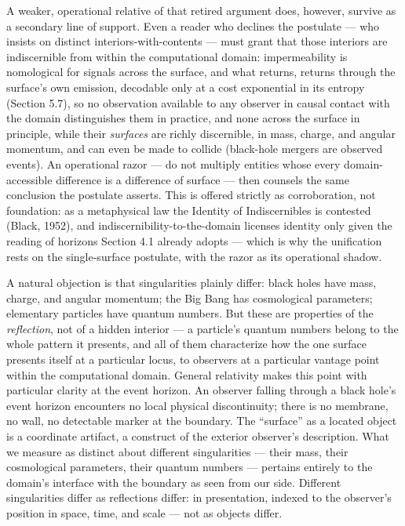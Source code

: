 \documentclass[
]{article}
\begin{document}
A weaker, operational relative of that retired argument does, however,
survive as a secondary line of support. Even a reader who declines the
postulate --- who insists on distinct interiors-with-contents --- must
grant that those interiors are indiscernible from within the
computational domain: impermeability is nomological for signals across
the surface, and what returns, returns through the surface's own
emission, decodable only at a cost exponential in its entropy (Section
5.7), so no observation available to any observer in causal contact with
the domain distinguishes them in practice, and none across the surface
in principle, while their \emph{surfaces} are richly discernible, in
mass, charge, and angular momentum, and can even be made to collide
(black-hole mergers are observed events). An operational razor --- do
not multiply entities whose every domain-accessible difference is a
difference of surface --- then counsels the same conclusion the
postulate asserts. This is offered strictly as corroboration, not
foundation: as a metaphysical law the Identity of Indiscernibles is
contested (Black, 1952), and indiscernibility-to-the-domain licenses
identity only given the reading of horizons Section 4.1 already adopts
--- which is why the unification rests on the single-surface postulate,
with the razor as its operational shadow.

A natural objection is that singularities plainly differ: black holes
have mass, charge, and angular momentum; the Big Bang has cosmological
parameters; elementary particles have quantum numbers. But these are
properties of the \emph{reflection}, not of a hidden interior --- a
particle's quantum numbers belong to the whole pattern it presents, and
all of them characterize how the one surface presents itself at a
particular locus, to observers at a particular vantage point within the
computational domain. General relativity makes this point with
particular clarity at the event horizon. An observer falling through a
black hole's event horizon encounters no local physical discontinuity;
there is no membrane, no wall, no detectable marker at the boundary. The
``surface'' as a located object is a coordinate artifact, a construct of
the exterior observer's description. What we measure as distinct about
different singularities --- their mass, their cosmological parameters,
their quantum numbers --- pertains entirely to the domain's interface
with the boundary as seen from our side. Different singularities differ
as reflections differ: in presentation, indexed to the observer's
position in space, time, and scale --- not as objects differ.
\end{document}
